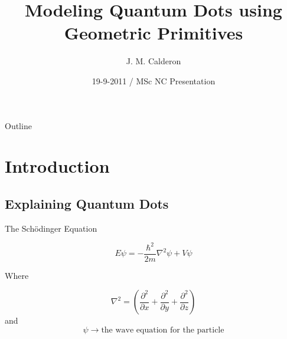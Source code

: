 \documentclass{beamer}
\title[Quantum Dots with Primitives] %
{Modeling Quantum Dots using Geometric Primitives}
\subtitle
{} %
\author[] %
{J. M. Calderon}
\institute[University of York] %
{%
  Department of Computer Science\\
  University of York
 }
\date[] %
{19-9-2011 / MSc NC Presentation}
\begin{document}
\begin{frame}
  \titlepage
\end{frame}

\begin{frame}{Outline}
  \tableofcontents
\end{frame}




\section{Introduction}

\subsection[What are Quantum Dots?]{Explaining Quantum Dots}

\begin{frame}
The Sch\"{o}dinger Equation

\begin{equation}
E\psi = -\frac{\hbar ^2}{2m}\nabla ^2 \psi + V\psi \nonumber
\label{eq:timeIndependent2}
\end{equation}

Where

\begin{equation}
\nabla ^2 =  \left(\frac{\partial ^2}{\partial x} + \frac{\partial ^2}{\partial y} + \frac{\partial ^2}{\partial z}\right) \nonumber
\label{eq:laplace}
\end{equation}
and
$$\psi \rightarrow \text{the wave equation for the particle}$$
\end{frame}
\end{document}
